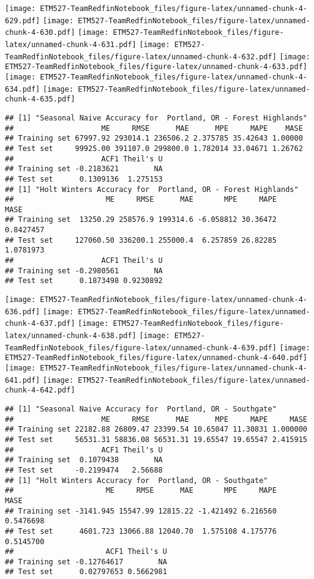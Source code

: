 \documentclass[]{article}
\begin{document}
\texttt{[image: ETM527-TeamRedfinNotebook\_files/figure-latex/unnamed-chunk-4-629.pdf]}
\texttt{[image: ETM527-TeamRedfinNotebook\_files/figure-latex/unnamed-chunk-4-630.pdf]}
\texttt{[image: ETM527-TeamRedfinNotebook\_files/figure-latex/unnamed-chunk-4-631.pdf]}
\texttt{[image: ETM527-TeamRedfinNotebook\_files/figure-latex/unnamed-chunk-4-632.pdf]}
\texttt{[image: ETM527-TeamRedfinNotebook\_files/figure-latex/unnamed-chunk-4-633.pdf]}
\texttt{[image: ETM527-TeamRedfinNotebook\_files/figure-latex/unnamed-chunk-4-634.pdf]}
\texttt{[image: ETM527-TeamRedfinNotebook\_files/figure-latex/unnamed-chunk-4-635.pdf]}

\begin{verbatim}
## [1] "Seasonal Naive Accuracy for  Portland, OR - Forest Highlands"
##                    ME     RMSE      MAE      MPE     MAPE    MASE
## Training set 67997.92 293014.1 236506.2 2.375785 35.42643 1.00000
## Test set     99925.00 391107.0 299800.0 1.782014 33.04671 1.26762
##                    ACF1 Theil's U
## Training set -0.2183621        NA
## Test set      0.1309136  1.275153
## [1] "Holt Winters Accuracy for  Portland, OR - Forest Highlands"
##                     ME     RMSE      MAE       MPE     MAPE      MASE
## Training set  13250.29 258576.9 199314.6 -6.058812 30.36472 0.8427457
## Test set     127060.50 336200.1 255000.4  6.257859 26.82285 1.0781973
##                    ACF1 Theil's U
## Training set -0.2980561        NA
## Test set      0.1873498 0.9230892
\end{verbatim}

\texttt{[image: ETM527-TeamRedfinNotebook\_files/figure-latex/unnamed-chunk-4-636.pdf]}
\texttt{[image: ETM527-TeamRedfinNotebook\_files/figure-latex/unnamed-chunk-4-637.pdf]}
\texttt{[image: ETM527-TeamRedfinNotebook\_files/figure-latex/unnamed-chunk-4-638.pdf]}
\texttt{[image: ETM527-TeamRedfinNotebook\_files/figure-latex/unnamed-chunk-4-639.pdf]}
\texttt{[image: ETM527-TeamRedfinNotebook\_files/figure-latex/unnamed-chunk-4-640.pdf]}
\texttt{[image: ETM527-TeamRedfinNotebook\_files/figure-latex/unnamed-chunk-4-641.pdf]}
\texttt{[image: ETM527-TeamRedfinNotebook\_files/figure-latex/unnamed-chunk-4-642.pdf]}

\begin{verbatim}
## [1] "Seasonal Naive Accuracy for  Portland, OR - Southgate"
##                    ME     RMSE      MAE      MPE     MAPE     MASE
## Training set 22182.88 26809.47 23399.54 10.65047 11.30831 1.000000
## Test set     56531.31 58836.08 56531.31 19.65547 19.65547 2.415915
##                    ACF1 Theil's U
## Training set  0.1079438        NA
## Test set     -0.2199474   2.56688
## [1] "Holt Winters Accuracy for  Portland, OR - Southgate"
##                     ME     RMSE      MAE       MPE     MAPE      MASE
## Training set -3141.945 15547.99 12815.22 -1.421492 6.216560 0.5476698
## Test set      4601.723 13066.88 12040.70  1.575108 4.175776 0.5145700
##                     ACF1 Theil's U
## Training set -0.12764617        NA
## Test set      0.02797653 0.5662981
\end{verbatim}
\end{document}
